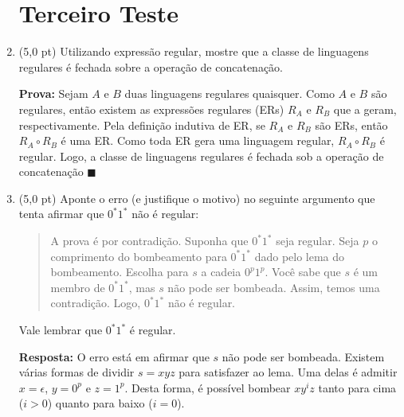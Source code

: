 \documentclass[12pt,a4paper,oneside]{article}
\begin{document}
\begin{enumerate}
	
	\section*{Terceiro Teste}
	
	\item (5,0 pt) Utilizando expressão regular, mostre que a classe de linguagens regulares é fechada sobre a operação de concatenação.
	
	\vspace*{0.3cm}
	
	{\color{blue}
		{\bf Prova:} Sejam $A$ e $B$ duas linguagens regulares quaisquer. Como $A$ e $B$ são regulares, então existem as expressões regulares (ERs) $R_A$ e $R_B$ que a geram, respectivamente. Pela definição indutiva de ER, se $R_A$ e $R_B$ são ERs, então $R_A \circ R_B$ é uma ER. Como toda ER gera uma linguagem regular, $R_A \circ R_B$ é regular. Logo, a classe de linguagens regulares é fechada sob a operação de concatenação $\blacksquare$
	}
	
	\item (5,0 pt) Aponte o erro (e justifique o motivo) no seguinte argumento que tenta afirmar que $0^*1^*$ não é regular:
	\begin{quote}
		A prova é por contradição. Suponha que $0^*1^*$ seja regular. Seja $p$ o comprimento do bombeamento para $0^*1^*$ dado pelo lema do bombeamento. Escolha para $s$ a cadeia $0^p1^p$. Você sabe que $s$ é um membro de $0^*1^*$, mas $s$ não pode ser bombeada. Assim, temos uma contradição. Logo, $0^*1^*$ não é regular.
	\end{quote}
	Vale lembrar que $0^*1^*$ é regular.
	
		\vspace*{0.3cm}
	
	{\color{blue} 
		{\bf Resposta:} O erro está em afirmar que $s$ não pode ser bombeada. Existem várias formas de dividir $s = xyz$ para satisfazer ao lema. Uma delas é admitir $x = \epsilon$, $y = 0^p$ e $z = 1^p$. Desta forma, é possível bombear $xy^iz$ tanto para cima ($i>0$) quanto para baixo ($i=0$).
	}
	
\end{enumerate}
\end{document}
